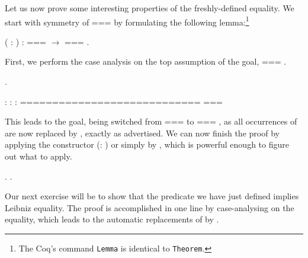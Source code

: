 Let us now prove some interesting properties of the freshly-defined
equality. We start with symmetry of === by formulating the
following lemma:\footnote{The Coq's command \texttt{Lemma} is
identical to \texttt{Theorem}.}


\begin{coqdoccode}
\coqdocemptyline
\coqdocnoindent
{}   ( : ) :  ===  \ensuremath{\rightarrow}  === .\coqdoceol
\coqdocemptyline
\end{coqdoccode}


First, we perform the case analysis on the top assumption of the goal,
 === .


\begin{coqdoccode}
\coqdocemptyline
\coqdocnoindent
{}.\coqdoceol
\coqdocemptyline
\end{coqdoccode}


\coqdoceol
\coqdocemptyline
\coqdocindent{1.00em}
 : \coqdoceol
\coqdocindent{1.00em}
 : \coqdoceol
\coqdocindent{1.00em}
 : \coqdoceol
\coqdocindent{1.00em}
============================\coqdoceol
\coqdocindent{1.50em}
 === 

\coqdocemptyline


This leads to the goal, being switched from  ===  to  === , as
all occurrences of  are now replaced by , exactly as advertised.
We can now finish the proof by applying the constructor (:
) or simply by , which is powerful enough to figure
out what to apply.


\begin{coqdoccode}
\coqdocemptyline
\coqdocnoindent
{}.\coqdoceol
\coqdocnoindent
{}.\coqdoceol
\coqdocemptyline
\end{coqdoccode}


Our next exercise will be to show that the predicate we have just
defined implies Leibniz equality. The proof is accomplished in one
 line by case-analysing on the equality,
which leads to the automatic replacements of  by .


